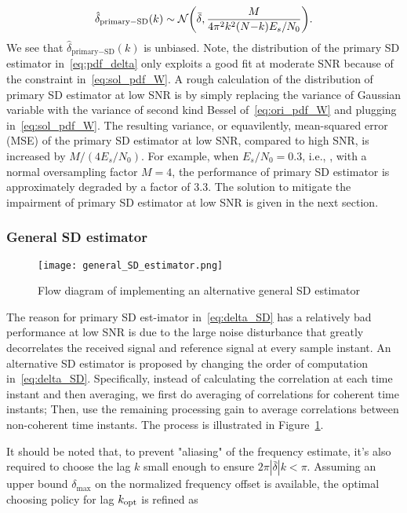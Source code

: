 \begin{equation}
    \label{eq:pdf_delta}
        \hat{\delta}_{\text{primary}-\text{SD}}(k) \sim \mathcal{N} \bigg(\bar{\delta},\frac{M}{4\pi^2k^2(N{-}k)E_s/N_0}\bigg).
  \end{equation}  
We see that $\hat{\delta}_{\text{primary}-\text{SD}}(k)$ is unbiased. 
Note, the distribution of the primary SD estimator in~\eqref{eq:pdf_delta} only exploits a good fit at moderate SNR because of
the constraint in~\eqref{eq:sol_pdf_W}. A rough calculation of the distribution of primary SD estimator at low SNR is by simply 
replacing the variance of Gaussian variable with the variance of second kind Bessel
of~\eqref{eq:ori_pdf_W} and plugging in~\eqref{eq:sol_pdf_W}. The resulting variance, or equavilently, mean-squared error (MSE) of the primary 
SD estimator at low SNR, compared to high SNR, is increased by $M/(4E_s/N_0)$.
For example, when $E_s/N_0=0.3$, i.e., \dB, with a normal oversampling factor $M=4$,
the performance of primary SD estimator is approximately degraded by a factor of 3.3.
The solution to mitigate the impairment of primary SD estimator at low SNR
is given in the next section.

\subsubsection{General SD estimator}

\begin{figure}[t]
  \centerline{\texttt{[image: general\_SD\_estimator.png]}}
  \caption{Flow diagram of implementing an alternative general SD estimator}
  \label{fig:general_SD_estimator}
  \end{figure}

The reason for primary SD est-imator in~\eqref{eq:delta_SD} has a relatively bad performance at low SNR is due to the large noise
disturbance that greatly decorrelates the received signal and reference signal at every sample instant.
An alternative SD estimator is proposed by changing the order of computation in~\eqref{eq:delta_SD}.
Specifically, instead of calculating the correlation at each time instant and then averaging, we first do averaging of 
correlations for coherent time instants; Then, use the remaining processing gain to average 
correlations between non-coherent time instants.
The process is illustrated in Figure~\ref{fig:general_SD_estimator}. 


It should be noted that, to prevent "aliasing" of the frequency estimate, it's also required to choose the lag $k$ small enough to ensure $2\pi |\bar{\delta}| k < \pi$.
Assuming an upper bound $\delta_{\text{max}}$ on the normalized frequency offset is available, 
the optimal choosing policy for lag $k_{\text{opt}}$ is refined as

